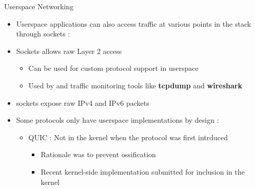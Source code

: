 \begin{frame}{Userspace Networking}
	\begin{itemize}
		\item Userspace applications can also access traffic at various points in the stack through sockets :
		\item {} Sockets allows raw Layer 2 access
			 \begin{itemize}
				 \item Can be used for custom protocol support in userspace
				 \item Used by  and traffic monitoring tools like \textbf{tcpdump} and \textbf{wireshark}
			 \end{itemize}
		 \item {} sockets expose raw IPv4 and IPv6 packets
		\item Some protocols only have userspace implementations by design :
			\begin{itemize}
				\item QUIC : Not in the kernel when the protocol was first intrduced
					\begin{itemize}
						\item Rationale was to prevent ossification
						\item Recent kernel-side implementation submitted for inclusion in the kernel
					\end{itemize}
			\end{itemize}
	\end{itemize}
\end{frame}

